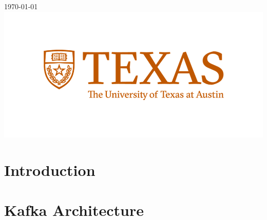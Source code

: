 \begin{titlepage}


{\large \today}\\[2cm] %


\includegraphics{logo.png}\\[1cm] %
 

\vfill %

\end{titlepage}

\twocolumn

\begin{abstract}
\end{abstract}

\section{Introduction}

\section{Kafka Architecture}

